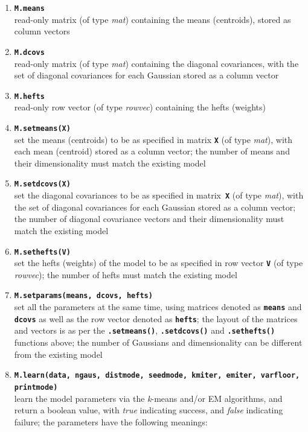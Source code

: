 \documentclass[10pt,a4paper]{article}
\def\_{{\tt\char95}}
\begin{document}
\begin{small}
\begin{enumerate}[{$\bullet$}]
\item
{\tt\bfseries M.means}\\
read-only matrix (of type {\it mat}) containing the means (centroids), stored as column vectors

\item
{\tt\bfseries M.dcovs}\\
read-only matrix (of type {\it mat}) containing the diagonal covariances, with the set of diagonal covariances for each Gaussian stored as a column vector

\item
{\tt\bfseries M.hefts}\\
read-only row vector (of type {\it rowvec}) containing the hefts (weights)

\item
{\tt\bfseries M.set\_means(X)}\\
set the means (centroids) to be as specified in matrix {\tt\bfseries X} (of type {\it mat}), with each mean (centroid) stored as a column vector;
the number of means and their dimensionality must match the existing model

\item
{\tt\bfseries M.set\_dcovs(X)}\\
set the diagonal covariances to be as specified in matrix~{\tt\bfseries X} (of type {\it mat}), with the set of diagonal covariances for each Gaussian stored as a column vector;
the number of diagonal covariance vectors and their dimensionality must match the existing model

\item
{\tt\bfseries M.set\_hefts(V)}\\
set the hefts (weights) of the model to be as specified in row vector {\tt\bfseries V} (of type {\it rowvec});
the number of hefts must match the existing model

\item
{\tt\bfseries M.set\_params(means, dcovs, hefts)}\\
set all the parameters at the same time, using matrices denoted as {\tt\bfseries means} and {\tt\bfseries dcovs} as well as the row vector denoted as {\tt\bfseries hefts};
the layout of the matrices and vectors is as per the {\tt\bfseries .set\_means()}, {\tt\bfseries .set\_dcovs()} and {\tt\bfseries .set\_hefts()} functions above;
the number of Gaussians and dimensionality can be different from the existing model

\item
{\tt\bfseries M.learn(data, n\_gaus, dist\_mode, seed\_mode, km\_iter, em\_iter, var\_floor, print\_mode)}\\
learn the model parameters via the {\it k}-means and/or EM algorithms,
and return a boolean value, with {\it true} indicating success, and {\it false} indicating failure;
the parameters have the following meanings:


\end{enumerate}
\end{small}
\end{document}
